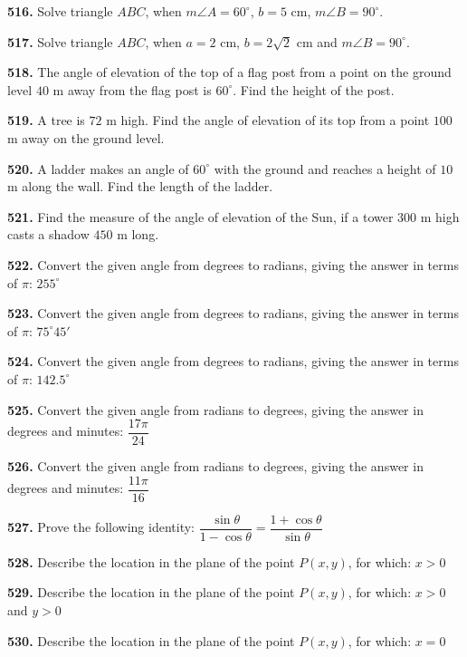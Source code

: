 \documentclass[11pt]{article}
\begin{document}
\bigskip
\noindent\textbf{516.} Solve triangle $ABC$, when $m\angle A = 60^{\circ}$, $b=5$ cm, $m\angle B = 90^{\circ}$.

\bigskip
\noindent\textbf{517.} Solve triangle $ABC$, when $a=2$ cm, $b=2\sqrt{2}$ cm and $m\angle B = 90^{\circ}$.

\bigskip
\noindent\textbf{518.} The angle of elevation of the top of a flag post from a point on the ground level $40$ m away from the flag post is $60^{\circ}$. Find the height of the post.

\bigskip
\noindent\textbf{519.} A tree is $72$ m high. Find the angle of elevation of its top from a point $100$ m away on the ground level.

\bigskip
\noindent\textbf{520.} A ladder makes an angle of $60^{\circ}$ with the ground and reaches a height of $10$ m along the wall. Find the length of the ladder.

\bigskip
\noindent\textbf{521.} Find the measure of the angle of elevation of the Sun, if a tower $300$ m high casts a shadow $450$ m long.

\bigskip
\noindent\textbf{522.} Convert the given angle from degrees to radians, giving the answer in terms of $\pi$: $255^{\circ}$

\bigskip
\noindent\textbf{523.} Convert the given angle from degrees to radians, giving the answer in terms of $\pi$: $75^{\circ}45'$

\bigskip
\noindent\textbf{524.} Convert the given angle from degrees to radians, giving the answer in terms of $\pi$: $142.5^{\circ}$

\bigskip
\noindent\textbf{525.} Convert the given angle from radians to degrees, giving the answer in degrees and minutes: $\dfrac{17\pi}{24}$

\bigskip
\noindent\textbf{526.} Convert the given angle from radians to degrees, giving the answer in degrees and minutes: $\dfrac{11\pi}{16}$

\bigskip
\noindent\textbf{527.} Prove the following identity: $\dfrac{\sin\theta}{1-\cos\theta} = \dfrac{1+\cos\theta}{\sin\theta}$

\bigskip
\noindent\textbf{528.} Describe the location in the plane of the point $P(x,y)$, for which: $x>0$

\bigskip
\noindent\textbf{529.} Describe the location in the plane of the point $P(x,y)$, for which: $x>0$ and $y>0$

\bigskip
\noindent\textbf{530.} Describe the location in the plane of the point $P(x,y)$, for which: $x=0$
\end{document}
